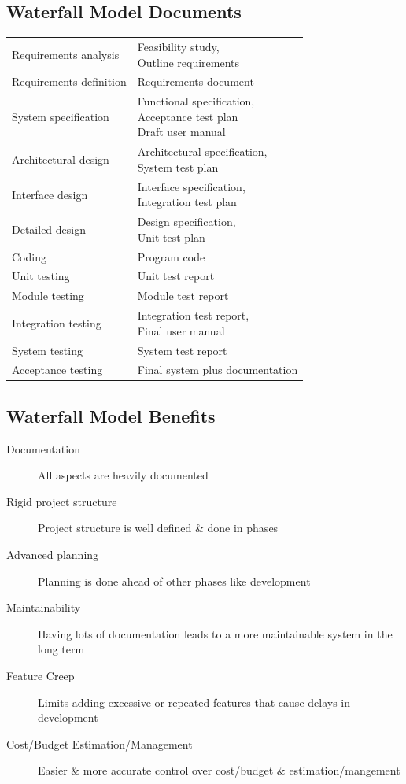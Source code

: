 \documentclass{report}
\begin{document}
\begin{multicols}{2}
\subsection{Waterfall Model Documents}
\begin{tabular}{|l|l|}
    \hline
	\thead{Activity} & \thead{Output Documents}\\
    \hline
Requirements analysis & \makecell[cl]{Feasibility study, \\ Outline requirements}\\
    \hline
Requirements definition & Requirements document\\
    \hline
System specification & \makecell[cl]{Functional specification, \\ Acceptance test plan \\ Draft user manual}\\
    \hline
Architectural design & \makecell[cl]{Architectural specification, \\ System test plan}\\
    \hline
Interface design & \makecell[cl]{Interface specification, \\ Integration test plan}\\
    \hline
Detailed design & \makecell[cl]{Design specification, \\ Unit test plan}\\
    \hline
Coding & Program code\\
    \hline
Unit testing & Unit test report\\
    \hline
Module testing & Module test report\\
    \hline
Integration testing & \makecell[cl]{Integration test report, \\ Final user manual}\\
    \hline
System testing & System test report\\
    \hline
Acceptance testing & Final system plus documentation\\
    \hline
  \end{tabular}
\end{multicols}

\subsection{Waterfall Model Benefits}
\begin{description}
  \item [Documentation] All aspects are heavily documented
  \item [Rigid project structure] Project structure is well defined \& done in phases
  \item [Advanced planning] Planning is done ahead of other phases like development
  \item [Maintainability] Having lots of documentation leads to a more maintainable system in the long term
  \item [Feature Creep] Limits adding excessive or repeated features that cause delays in development
  \item [Cost/Budget Estimation/Management] Easier \& more accurate control over cost/budget \& estimation/mangement
\end{description}
\end{document}
